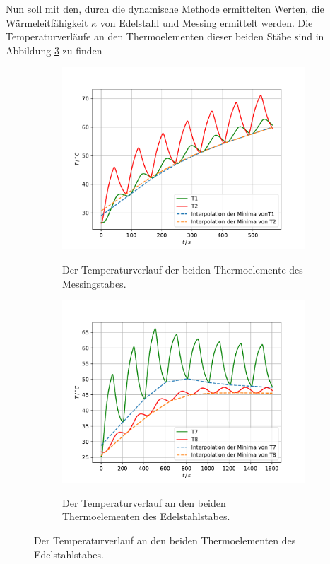 Nun soll mit den, durch die dynamische Methode ermittelten Werten, die Wärmeleitfähigkeit $\kappa$ von Edelstahl und Messing ermittelt werden.
Die Temperaturverläufe an den Thermoelementen dieser beiden Stäbe sind in Abbildung \ref{fig:dyn} zu finden
\begin{figure}
    \centering
    \caption{Zwei Temperaturverläufe von zwei Metallen.}
    \begin{subfigure}{\textwidth/2}
        \centering
        \caption{Der Temperaturverlauf der beiden Thermoelemente des Messingstabes.}
        \includegraphics[width = \textwidth]{content/data/dynamisch_T1_T2.pdf}
        \label{fig:dyn_T1_T2}
    \end{subfigure}
    \begin{subfigure}{\textwidth/2}
        \centering
        \caption{Der Temperaturverlauf an den beiden Thermoelementen des Edelstahlstabes.}
        \includegraphics[width=\textwidth]{content/data/dynamisch_T7_T8.pdf}
        \label{fig:dyn_T7_T8}
    \end{subfigure}
\label{fig:dyn}
\end{figure}

